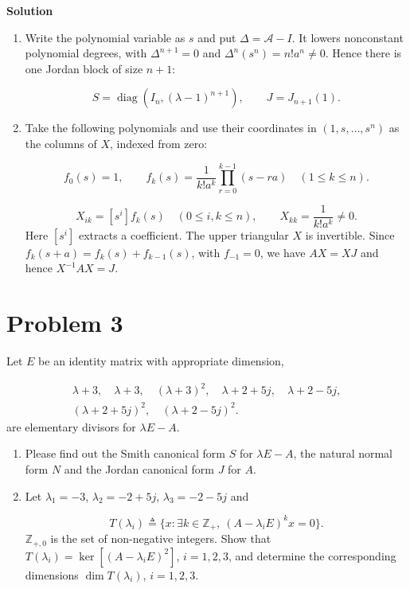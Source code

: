 \documentclass[UTF8,10pt,letterpaper,fontset=fandol]{ctexart}
\begin{document}
\par{}\textbf{Solution}\par

\begin{enumerate}
\item Write the polynomial variable as $s$ and put $\Delta=\mathcal A-I$. It lowers nonconstant polynomial degrees, with $\Delta^{n+1}=0$ and $\Delta^n(s^n)=n!a^n\ne0$. Hence there is one Jordan block of size $n+1$:

\[
\boxed{S=\operatorname{diag}(I_n,(\lambda-1)^{n+1}),\qquad J=J_{n+1}(1)}.
\]

\item Take the following polynomials and use their coordinates in $(1,s,\ldots,s^n)$ as the columns of $X$, indexed from zero:

\[
f_0(s)=1,\qquad
f_k(s)=\frac{1}{k!a^k}\prod_{r=0}^{k-1}(s-ra)\quad(1\le k\le n).
\]

\[
\boxed{X_{ik}=[s^i]f_k(s)\quad(0\le i,k\le n)},\qquad
X_{kk}=\frac{1}{k!a^k}\ne0.
\]
Here $[s^i]$ extracts a coefficient. The upper triangular $X$ is invertible. Since $f_k(s+a)=f_k(s)+f_{k-1}(s)$, with $f_{-1}=0$, we have $AX=XJ$ and hence $X^{-1}AX=J$.

\end{enumerate}

\newpage

\section{Problem 3}
Let $E$ be an identity matrix with appropriate dimension,

\[
\begin{gathered}
\lambda+3,\quad\lambda+3,\quad(\lambda+3)^2,\quad\lambda+2+5j,\quad\lambda+2-5j,\\
(\lambda+2+5j)^2,\quad(\lambda+2-5j)^2.
\end{gathered}
\]
are elementary divisors for $\lambda E-A$.

\begin{enumerate}
\item Please find out the Smith canonical form $S$ for $\lambda E-A$, the natural normal form $N$ and the Jordan canonical form $J$ for $A$.

\item Let $\lambda_1=-3$, $\lambda_2=-2+5j$, $\lambda_3=-2-5j$ and

\[
T(\lambda_i)\triangleq\{x:\exists k\in\mathbb Z_+,\ (A-\lambda_iE)^kx=0\}.
\]
$\mathbb Z_{+,0}$ is the set of non-negative integers. Show that $T(\lambda_i)=\ker[(A-\lambda_iE)^2]$, $i=1,2,3$, and determine the corresponding dimensions $\dim T(\lambda_i)$, $i=1,2,3$.

\end{enumerate}
\end{document}
